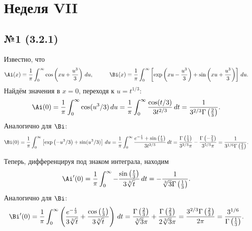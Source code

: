 \section{Неделя VII}

\subsection*{№1 (3.2.1)}

Известно, что 
\begin{equation*}
    \Ai (x) = \frac{1}{\pi} \int_{0}^{\infty} \cos\left(x u + \frac{u^3}{3}\right) \d u,
    \hspace{10 mm} 
    \Bi(x) = \frac{1}{\pi} \int_{0}^{\infty} \left[
        \exp\left(x u - \frac{u^3}{3}\right) + \sin\left(x u + \frac{u^3}{3}\right)
    \right] \d u.
\end{equation*}
Найдём значения в $x = 0$, переходя к $u = t^{1/3}$:
\begin{equation*}
    \Ai(0) = \frac{1}{\pi} \int_{0}^{\infty} \cos( u^3/3) \d u = 
    \frac{1}{\pi} \int_{0}^{\infty} \frac{\cos(t/3) }{3 t^{2/3}}\d t = \frac{1}{3^{2/3} \Gamma\left(\frac{2}{3}\right)}.
\end{equation*}
Аналогично для $\Bi$:
\begin{equation*}
    \Bi(0) = \frac{1}{\pi} \int_{0}^{\infty} \left[
        \exp\left( - u^3/3\right) + \sin( u^3/3)
    \right] \d u = 
    \frac{1}{\pi} \int_{0}^{\infty} \frac{e^{-\frac{t}{3}}+\sin \left(\frac{t}{3}\right)}{3 t^{2/3}} \d t =  
    \frac{\Gamma \left(\frac{1}{3}\right)}{3^{2/3} \pi } -\frac{\Gamma \left(-\frac{2}{3}\right)}{3^{5/3} \pi } = \frac{1}{3^{1/6} \Gamma\left(\frac{2}{3}\right)}.
\end{equation*}

Теперь, дифференцируя под знаком интеграла, находим
\begin{equation*}
    \Ai'(0) = 
    \frac{1}{\pi} \int_{0}^{\infty} 
    -\frac{\sin \left(\frac{t}{3}\right)}{3 \sqrt[3]{t}}
    \d t = -\frac{1}{\sqrt[3]{3} \Gamma \left(\frac{1}{3}\right)}.
\end{equation*}
Аналогично для $\Bi$:
\begin{equation*}
    \Bi'(0) = 
    \frac{1}{\pi} \int_{0}^{\infty} 
    \left(
        \frac{e^{-\frac{t}{3}}}{3 \sqrt[3]{t}}+\frac{\cos \left(\frac{t}{3}\right)}{3 \sqrt[3]{t}}
    \right)
    \d t = \frac{\Gamma \left(\frac{2}{3}\right)}{\sqrt[3]{3} \pi } + \frac{\Gamma \left(\frac{2}{3}\right)}{2 \sqrt[3]{3} \pi } = \frac{3^{2/3} \Gamma \left(\frac{2}{3}\right)}{2 \pi } = \frac{3^{1/6}}{\Gamma\left(\frac{1}{3}\right)}.
\end{equation*}


